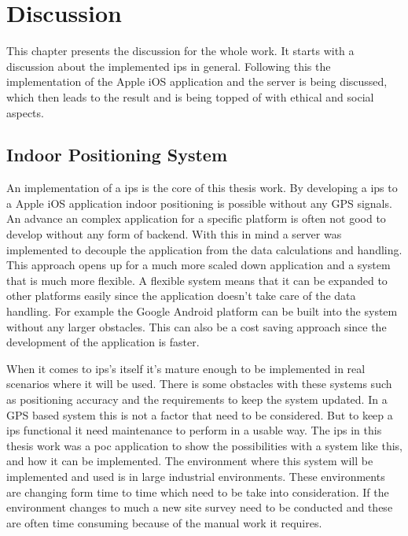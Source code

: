 \chapter{Discussion} \label{discussion}
This chapter presents the discussion for the whole work.
It starts with a discussion about the implemented \acrfull{ips} in general.
Following this the implementation of the Apple iOS application and the server is being discussed, which then leads to the result and is being topped of with ethical and social aspects.


\section{Indoor Positioning System}\label{sec:discussionIps}
An implementation of a \acrshort{ips} is the core of this thesis work.
By developing a \acrshort{ips} to a Apple iOS application indoor positioning is possible without any GPS signals.
An advance an complex application for a specific platform is often not good to develop without any form of backend.
With this in mind a server was implemented to decouple the application from the data calculations and handling.
This approach opens up for a much more scaled down application and a system that is much more flexible.
A flexible system means that it can be expanded to other platforms easily since the application doesn't take care of the data handling.
For example the Google Android platform can be built into the system without any larger obstacles.
This can also be a cost saving approach since the development of the application is faster.

\bigskip

When it comes to \acrshort{ips}'s itself it's mature enough to be implemented in real scenarios where it will be used.
There is some obstacles with these systems such as positioning accuracy and the requirements to keep the system updated. 
In a GPS based system this is not a factor that need to be considered.
But to keep a \acrshort{ips} functional it need maintenance to perform in a usable way.
The \acrshort{ips} in this thesis work was a \acrfull{poc} application to show the possibilities with a system like this, and how it can be implemented.
The environment where this system will be implemented and used is in large industrial environments.
These environments are changing form time to time which need to be take into consideration.
If the environment changes to much a new site survey need to be conducted and these are often time consuming because of the manual work it requires.


